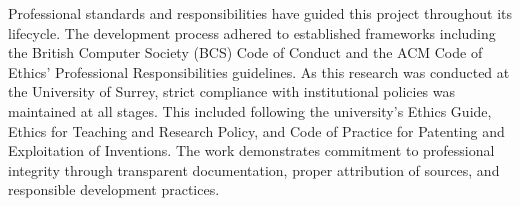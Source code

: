Professional standards and responsibilities have guided this project throughout its lifecycle. 
The development process adhered to established frameworks including the British Computer Society (BCS) Code of Conduct and the ACM Code of Ethics' Professional Responsibilities guidelines.
As this research was conducted at the University of Surrey, strict compliance with institutional policies was maintained at all stages. 
This included following the university's Ethics Guide, Ethics for Teaching and Research Policy, and Code of Practice for Patenting and Exploitation of Inventions.
The work demonstrates commitment to professional integrity through transparent documentation, proper attribution of sources, and responsible development practices.
